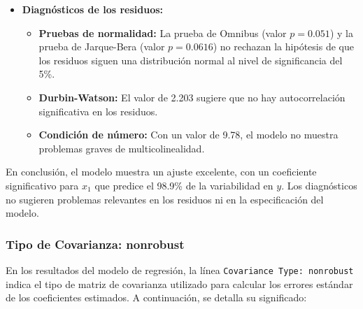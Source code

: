 \documentclass[a4paper,12pt]{article}
\begin{document}
\begin{itemize}
    \item \textbf{Diagnósticos de los residuos:}
    \begin{itemize}
        \item \textbf{Pruebas de normalidad:} La prueba de Omnibus (valor $p = 0.051$) y la prueba de Jarque-Bera (valor $p = 0.0616$) no rechazan la hipótesis de que los residuos siguen una distribución normal al nivel de significancia del 5\%.
        \item \textbf{Durbin-Watson:} El valor de 2.203 sugiere que no hay autocorrelación significativa en los residuos.
        \item \textbf{Condición de número:} Con un valor de 9.78, el modelo no muestra problemas graves de multicolinealidad.
    \end{itemize}
\end{itemize}

En conclusión, el modelo muestra un ajuste excelente, con un coeficiente significativo para $x_1$ que predice el 98.9\% de la variabilidad en $y$. Los diagnósticos no sugieren problemas relevantes en los residuos ni en la especificación del modelo.

\subsubsection{Tipo de Covarianza: nonrobust}

En los resultados del modelo de regresión, la línea \texttt{Covariance Type: nonrobust} indica el tipo de matriz de covarianza utilizado para calcular los errores estándar de los coeficientes estimados. A continuación, se detalla su significado:
\end{document}
